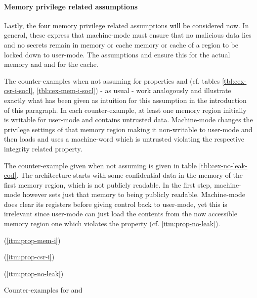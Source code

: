 \paragraph{Memory privilege related assumptions}
Lastly, the four memory privilege related assumptions will be considered now.
In general, these express that machine-mode must ensure that no malicious data lies and no secrets remain in memory or cache memory or cache of a region to be locked down to user-mode.
The assumptions  and  ensure this for the actual memory and  and  for the cache.

The counter-examples when not assuming  for properties  and  (cf. tables \ref{tbl:cex-csr-i-socl}, \ref{tbl:cex-mem-i-socl}) - as usual - work analogously and illustrate exactly what has been given as intuition for this assumption in the introduction of this paragraph.
In each counter-example, at least one memory region initially is writable for user-mode and contains untrusted data.
Machine-mode changes the privilege settings of that memory region making it non-writable to user-mode and then loads and uses a machine-word which is untrusted violating the respective integrity related property.

The counter-example given when not assuming  is given in table \ref{tbl:cex-no-leak-cod}.
The architecture starts with some confidential data in the memory of the first memory region, which is not publicly readable.
In the first step, machine-mode however sets just that memory to being publicly readable.
Machine-mode does clear its registers before giving control back to user-mode, yet this is irrelevant since user-mode can just load the contents from the now accessible memory region one which violates the  property (cf. \ref{itm:prop-no-leak}).

\begin{table}
    \begin{subtable}{\textwidth}
        \centering
        
        \caption{ (\ref{itm:prop-mem-i})}
        \label{tbl:cex-mem-i-socl}
    \end{subtable}

    \begin{subtable}{\textwidth}
        \centering
        
        \caption{ (\ref{itm:prop-csr-i})}
        \label{tbl:cex-csr-i-socl}
    \end{subtable}

    \begin{subtable}{\textwidth}
        \centering
        
        \caption{ (\ref{itm:prop-no-leak})}
        \label{tbl:cex-no-leak-cod}
    \end{subtable}
    \caption{Counter-examples for  and }
\end{table}

